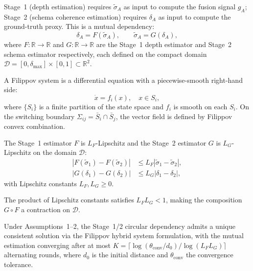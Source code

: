 
\begin{definition}
Stage~1 (depth estimation) requires $\tilde{\sigma}_A$ as input to
compute the fusion signal $g_A$; Stage~2 (schema coherence estimation)
requires $\delta_A$ as input to compute the ground-truth proxy. This is
a mutual dependency:
\[
\delta_A = F(\tilde{\sigma}_A), \qquad \tilde{\sigma}_A = G(\delta_A),
\]
where $F: \mathbb{R} \to \mathbb{R}$ and $G: \mathbb{R} \to \mathbb{R}$
are the Stage~1 depth estimator and Stage~2 schema estimator respectively,
each defined on the compact domain
$\mathcal{D} = [0, \delta_{\max}] \times [0, 1] \subset \mathbb{R}^2$.
\end{definition}

\begin{definition}
A Filippov system is a differential equation with a piecewise-smooth
right-hand side:
\[
\dot{x} = f_i(x), \quad x \in S_i,
\]
where $\{S_i\}$ is a finite partition of the state space and $f_i$ is
smooth on each $S_i$. On the switching boundary $\Sigma_{ij} = \bar{S}_i
\cap \bar{S}_j$, the vector field is defined by Filippov convex
combination.
\end{definition}

\begin{assumption}
The Stage~1 estimator $F$ is $L_F$-Lipschitz and the Stage~2 estimator
$G$ is $L_G$-Lipschitz on the domain $\mathcal{D}$:
\begin{align*}
|F(\tilde{\sigma}_1) - F(\tilde{\sigma}_2)| &\leq L_F |\tilde{\sigma}_1 - \tilde{\sigma}_2|, \\
|G(\delta_1) - G(\delta_2)| &\leq L_G |\delta_1 - \delta_2|,
\end{align*}
with Lipschitz constants $L_F, L_G \geq 0$.
\end{assumption}

\begin{assumption}
The product of Lipschitz constants satisfies $L_F L_G < 1$, making
the composition $G \circ F$ a contraction on $\mathcal{D}$.
\end{assumption}

\begin{proposition}
\label{prop:hybrid}
Under Assumptions~1--2, the Stage~1/2 circular dependency admits a
unique consistent solution via the Filippov hybrid system formulation,
with the mutual estimation converging after at most
$K = \lceil \log(\theta_{\text{conv}} / d_0) / \log(L_F L_G) \rceil$
alternating rounds, where $d_0$ is the initial distance and
$\theta_{\text{conv}}$ the convergence tolerance.
\end{proposition}


